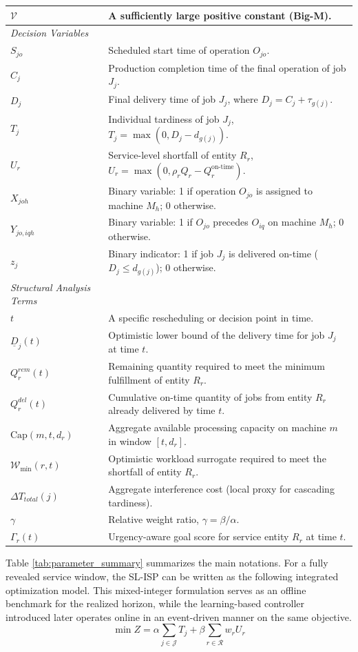 \documentclass[a4paper,fleqn]{cas-sc}
\begin{document}
\begin{table}[htbp]
\begin{tabular}{ll}
$\mathcal{V}$ & A sufficiently large positive constant (Big-M). \\
\midrule
\textit{Decision Variables} & \\
$S_{jo}$ & Scheduled start time of operation $O_{jo}$. \\
$C_j$ & Production completion time of the final operation of job $J_j$. \\
$D_j$ & Final delivery time of job $J_j$, where $D_j = C_j + \tau_{g(j)}$. \\
$T_j$ & Individual tardiness of job $J_j$, $T_j = \max(0, D_j - d_{g(j)})$. \\
$U_r$ & Service-level shortfall of entity $R_r$, $U_r = \max(0, \rho_r Q_r - Q_r^{\text{on-time}})$. \\
$X_{joh}$ & Binary variable: 1 if operation $O_{jo}$ is assigned to machine $M_h$; 0 otherwise. \\
$Y_{jo,iqh}$ & Binary variable: 1 if $O_{jo}$ precedes $O_{iq}$ on machine $M_h$; 0 otherwise. \\
$z_j$ & Binary indicator: 1 if job $J_j$ is delivered on-time ($D_j \le d_{g(j)}$); 0 otherwise. \\
\midrule
\textit{Structural Analysis Terms} & \\
$t$ & A specific rescheduling or decision point in time. \\
$\underline{D}_j(t)$ & Optimistic lower bound of the delivery time for job $J_j$ at time $t$. \\
$Q_r^{rem}(t)$ & Remaining quantity required to meet the minimum fulfillment of entity $R_r$. \\
$Q_r^{del}(t)$ & Cumulative on-time quantity of jobs from entity $R_r$ already delivered by time $t$. \\
$\text{Cap}(m, t, d_r)$ & Aggregate available processing capacity on machine $m$ in window $[t, d_r]$. \\
$\mathcal{W}_{\min}(r, t)$ & Optimistic workload surrogate required to meet the shortfall of entity $R_r$. \\
$\Delta T_{total}(j)$ & Aggregate interference cost (local proxy for cascading tardiness). \\
$\gamma$ & Relative weight ratio, $\gamma = \beta/\alpha$. \\
$\Gamma_r(t)$ & Urgency-aware goal score for service entity $R_r$ at time $t$. \\
\bottomrule
\end{tabular}
\end{table}
Table \ref{tab:parameter_summary} summarizes the main notations. For a fully revealed service window, the SL-ISP can be written as the following integrated optimization model. This mixed-integer formulation serves as an offline benchmark for the realized horizon, while the learning-based controller introduced later operates online in an event-driven manner on the same objective.
\begin{equation}
\min Z = \alpha \sum_{j \in \mathcal{J}} T_j + \beta \sum_{r \in \mathcal{R}} w_r U_r
\end{equation}
\end{document}
